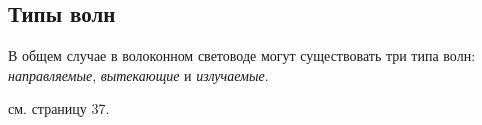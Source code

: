 \subsection{Типы волн}

В общем случае в волоконном световоде могут существовать три типа волн: \textit{направляемые}, \textit{вытекающие} и \textit{излучаемые}. 



 см. страницу 37.